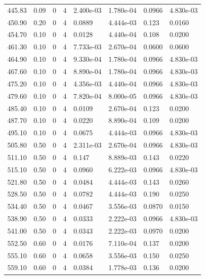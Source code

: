 \documentclass[preview]{standalone}
\begin{document}
{{{{\begin{tabular}{L{1.2cm}C{1.2cm} C{0.3cm}C{0.5cm} C{1.4cm}C{1.4cm} C{1.4cm}C{1.4cm}}
  445.83  &  0.09  & 0     &  4 &  2.400e-03  & 1.780e-04  & 0.0966 &  4.830e-03   \\ 
  450.90  &  0.20  & 0     &  4 &  0.0889  & 4.444e-03  & 0.123 &  0.0160   \\ 
  454.70  &  0.10  & 0     &  4 &  0.0128  & 4.440e-04  & 0.108 &  0.0200   \\ 
  461.30  &  0.10  & 0     &  4 &  7.733e-03  & 2.670e-04  & 0.0600 &  0.0600   \\ 
  464.90  &  0.10  & 0     &  4 &  9.330e-04  & 1.780e-04  & 0.0966 &  4.830e-03   \\ 
  467.60  &  0.10  & 0     &  4 &  8.890e-04  & 1.780e-04  & 0.0966 &  4.830e-03   \\ 
  475.20  &  0.10  & 0     &  4 &  4.356e-03  & 4.440e-04  & 0.0966 &  4.830e-03   \\ 
  479.60  &  0.10  & 0     &  4 &  7.820e-04  & 8.000e-05  & 0.0966 &  4.830e-03   \\ 
  485.40  &  0.10  & 0     &  4 &  0.0109  & 2.670e-04  & 0.123 &  0.0200   \\ 
  487.70  &  0.10  & 0     &  4 &  0.0220  & 8.890e-04  & 0.109 &  0.0200   \\ 
  495.10  &  0.10  & 0     &  4 &  0.0675  & 4.444e-03  & 0.0966 &  4.830e-03   \\ 
  505.80  &  0.50  & 0     &  4 &  2.311e-03  & 2.670e-04  & 0.0966 &  4.830e-03   \\ 
  511.10  &  0.50  & 0     &  4 &  0.147  & 8.889e-03  & 0.143 &  0.0220   \\ 
  515.10  &  0.50  & 0     &  4 &  0.0960  & 6.222e-03  & 0.0966 &  4.830e-03   \\ 
  521.80  &  0.50  & 0     &  4 &  0.0484  & 4.444e-03  & 0.143 &  0.0260   \\ 
  528.50  &  0.50  & 0     &  4 &  0.0782  & 4.444e-03  & 0.190 &  0.0250   \\ 
  534.40  &  0.50  & 0     &  4 &  0.0467  & 3.556e-03  & 0.0870 &  0.0150   \\ 
  538.90  &  0.50  & 0     &  4 &  0.0333  & 2.222e-03  & 0.0966 &  4.830e-03   \\ 
  541.00  &  0.50  & 0     &  4 &  0.0343  & 2.222e-03  & 0.0970 &  0.0200   \\ 
  552.50  &  0.60  & 0     &  4 &  0.0176  & 7.110e-04  & 0.137 &  0.0200   \\ 
  555.10  &  0.60  & 0     &  4 &  0.0658  & 3.556e-03  & 0.150 &  0.0250   \\ 
  559.10  &  0.60  & 0     &  4 &  0.0384  & 1.778e-03  & 0.136 &  0.0200   \\ 

\end{tabular}}}}}
\end{document}
